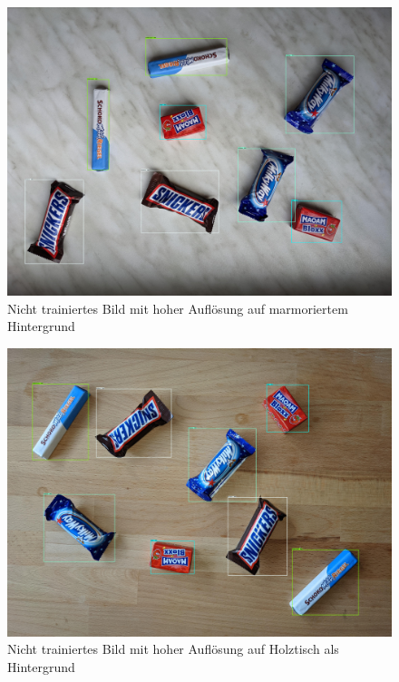     \begin{figure}[H]
        \centering
        \includegraphics[angle = 90, width = \textwidth]{Bilder/models/model_comparison/faster_rcnn_resnet50_v1_640x640_coco17_tpu-8/HD_on_marble.jpg}
        \caption{Nicht trainiertes Bild mit hoher Auflösung auf marmoriertem Hintergrund}
    \end{figure}
    
    \begin{figure}[H]
        \centering
        \includegraphics[angle = 90, width = \textwidth]{Bilder/models/model_comparison/faster_rcnn_resnet50_v1_640x640_coco17_tpu-8/HD_on_wood.jpg}
        \caption{Nicht trainiertes Bild mit hoher Auflösung auf Holztisch als Hintergrund}
    \end{figure}
    
